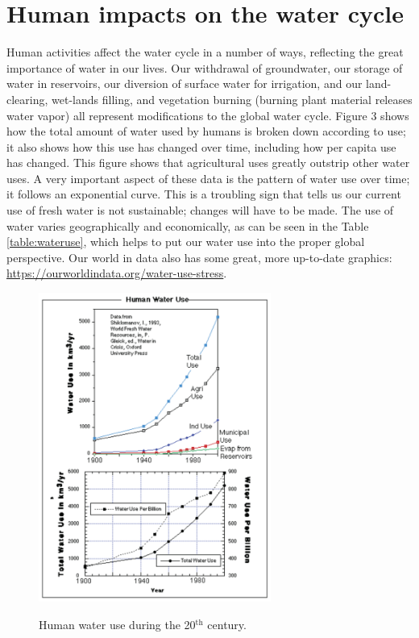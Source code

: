 \documentclass[11pt,letterpaper]{article}
\begin{document}
\section{Human impacts on the water cycle}
Human activities affect the water cycle in a number of ways, reflecting the great importance of water in our lives. Our withdrawal of groundwater, our storage of water in reservoirs, our diversion of surface water for irrigation, and our land-clearing, wet-lands filling, and vegetation burning (burning plant material releases water vapor) all represent modifications to the global water cycle. Figure 3 shows how the total amount of water used by humans is broken down according to use; it also shows how this use has changed over time, including how per capita use has changed. This figure shows that agricultural uses greatly outstrip other water uses. A very important aspect of these data is the pattern of water use over time; it follows an exponential curve. This is a troubling sign that tells us our current use of fresh water is not sustainable; changes will have to be made. The use of water varies geographically and economically, as can be seen in the Table \ref{table:wateruse}, which helps to put our water use into the proper global perspective. Our world in data also has some great, more up-to-date graphics: \url{https://ourworldindata.org/water-use-stress}.

\begin{figure}[h]
\begin{center}
\includegraphics[width=3in]{./wateruse}
\label{fig:wateruse}
\caption{Human water use during the 20$^{\mbox{th}}$ century.}
\end{center}
\end{figure}
\end{document}
